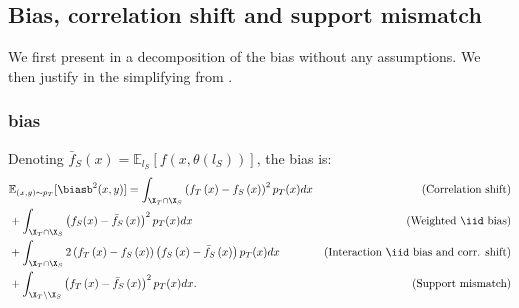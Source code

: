 \subsection{Bias, correlation shift and support mismatch}
\label{app:bias_correlation}
We first present in  a decomposition of the \ood bias without any assumptions.
We then justify in  the simplifying  from .
\subsubsection{\ood bias}
\label{app:app_bias_full}
\begin{proposition}
    \label{prop:app_bias_full}
    Denoting $\bar{f}_{S}\left(x\right) = \mathbb{E}_{l_S}[f\left(x,\theta\left(l_S\right)\right)]$, the bias is:
    \begin{align*}
        &\mathbb{E}_{(x,y)\sim p_T} [\biasb^2(x, y)] = \int_{\X_T \cap \X_S} \left(f_T\left(x\right)-f_S\left(x\right)\right)^{2} p_T(x) dx                                          & (\text{Correlation shift})                                               \\
                         & + \int_{\X_T \cap \X_S} \left(f_{S}(x)-\bar{f}_{S}\left(x\right)\right)^{2} p_T(x) dx                                                            & (\text{Weighted \iid bias})                                               \\
                         & + \int_{\X_T \cap \X_S} 2 \left(f_T\left(x\right) - f_S\left(x\right)\right) \left(f_S\left(x\right) - \bar{f}_{S}\left(x\right)\right) p_T(x)dx & (\text{Interaction \iid bias and corr. shift})                     \\
                         & + \int_{\X_T \setminus \X_S} \left(f_T\left(x\right)-\bar{f}_{S}\left(x\right)\right)^{2} p_T(x) dx.                                   & (\text{Support mismatch}) %
    \end{align*}%
\end{proposition}%

